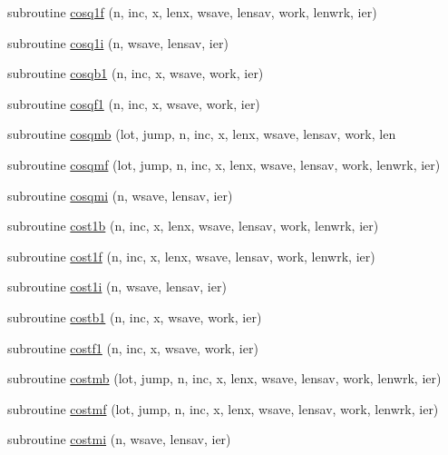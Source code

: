 \begin{DoxyCompactItemize}
\item 
subroutine \mbox{\hyperlink{namespacefftclass_a546e80f6eb00444bf4508ae26186e0d2}{cosq1f}} (n, inc, x, lenx, wsave, lensav, work, lenwrk, ier)
\item 
subroutine \mbox{\hyperlink{namespacefftclass_ab281b0d26ef5d825f00696ab35e18e65}{cosq1i}} (n, wsave, lensav, ier)
\item 
subroutine \mbox{\hyperlink{namespacefftclass_a4f908baf4cda5a6be5b71eb85fc9309c}{cosqb1}} (n, inc, x, wsave, work, ier)
\item 
subroutine \mbox{\hyperlink{namespacefftclass_a894b76f80148bf5d923d558356a6cc1a}{cosqf1}} (n, inc, x, wsave, work, ier)
\item 
subroutine \mbox{\hyperlink{namespacefftclass_a766146700483880896edee5e866f29a6}{cosqmb}} (lot, jump, n, inc, x, lenx, wsave, lensav, work, len
\item 
subroutine \mbox{\hyperlink{namespacefftclass_a48467d0cccf9f7f93786f4997fe714f5}{cosqmf}} (lot, jump, n, inc, x, lenx, wsave, lensav, work, lenwrk, ier)
\item 
subroutine \mbox{\hyperlink{namespacefftclass_a9851ac46e48072ac6c85e3c574a10dc5}{cosqmi}} (n, wsave, lensav, ier)
\item 
subroutine \mbox{\hyperlink{namespacefftclass_a2bdaaab2b5d3130f8339f9463daa6db9}{cost1b}} (n, inc, x, lenx, wsave, lensav, work, lenwrk, ier)
\item 
subroutine \mbox{\hyperlink{namespacefftclass_ae01eaac3c675ef6c95b60a480bda63ba}{cost1f}} (n, inc, x, lenx, wsave, lensav, work, lenwrk, ier)
\item 
subroutine \mbox{\hyperlink{namespacefftclass_aa0605a45256c5ff2bfcd9229dd8854e4}{cost1i}} (n, wsave, lensav, ier)
\item 
subroutine \mbox{\hyperlink{namespacefftclass_a2769de58926e8dc80c0fa9f862de7dce}{costb1}} (n, inc, x, wsave, work, ier)
\item 
subroutine \mbox{\hyperlink{namespacefftclass_af419be9c656e387f89facc1033cf4f55}{costf1}} (n, inc, x, wsave, work, ier)
\item 
subroutine \mbox{\hyperlink{namespacefftclass_a1bb83e3c96bf08b2789acf52feef22b8}{costmb}} (lot, jump, n, inc, x, lenx, wsave, lensav, work, lenwrk, ier)
\item 
subroutine \mbox{\hyperlink{namespacefftclass_a04e4666f4382e42cf8e63ee5c44fc61a}{costmf}} (lot, jump, n, inc, x, lenx, wsave, lensav, work, lenwrk, ier)
\item 
subroutine \mbox{\hyperlink{namespacefftclass_a4e2ea9d14ac7ed425be8cb1fd1ed8ddf}{costmi}} (n, wsave, lensav, ier)

\end{DoxyCompactItemize}
